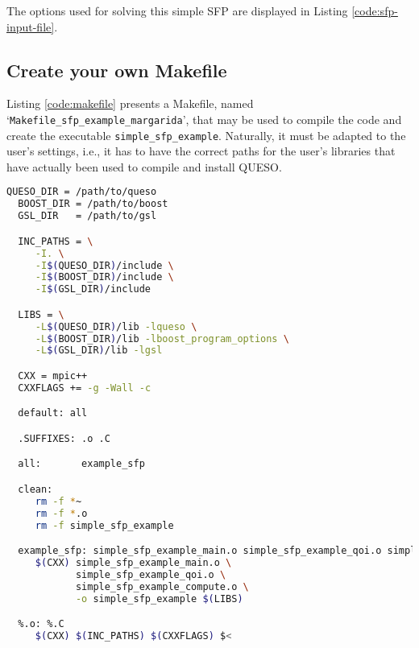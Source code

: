 The options used for solving this simple SFP are displayed in Listing \ref{code:sfp-input-file}.






\subsection{Create your own Makefile}\label{sec:sfp-makefile}


Listing \ref{code:makefile} presents a Makefile, named `\texttt{Makefile\_sfp\_example\_margarida}', that may be used to compile the code and create the executable \verb+simple_sfp_example+. Naturally, it must be adapted to the user's settings, i.e., it has to have the correct paths for the user's libraries that have actually been used to compile and install QUESO.

\begin{lstlisting}[caption={Makefile for the application code in Listings
  \ref{code:sfp-main-c}--\ref{code:sfp-compute-c}},
  label={code:sfp-makefile},
  language={bash}]
  QUESO_DIR = /path/to/queso
  BOOST_DIR = /path/to/boost
  GSL_DIR   = /path/to/gsl

  INC_PATHS = \
     -I. \
     -I$(QUESO_DIR)/include \
     -I$(BOOST_DIR)/include \
     -I$(GSL_DIR)/include

  LIBS = \
     -L$(QUESO_DIR)/lib -lqueso \
     -L$(BOOST_DIR)/lib -lboost_program_options \
     -L$(GSL_DIR)/lib -lgsl

  CXX = mpic++
  CXXFLAGS += -g -Wall -c

  default: all

  .SUFFIXES: .o .C

  all:       example_sfp

  clean:
     rm -f *~
     rm -f *.o
     rm -f simple_sfp_example

  example_sfp: simple_sfp_example_main.o simple_sfp_example_qoi.o simple_sfp_example_compute.o
     $(CXX) simple_sfp_example_main.o \
            simple_sfp_example_qoi.o \
            simple_sfp_example_compute.o \
            -o simple_sfp_example $(LIBS)

  %.o: %.C
     $(CXX) $(INC_PATHS) $(CXXFLAGS) $<
\end{lstlisting}

